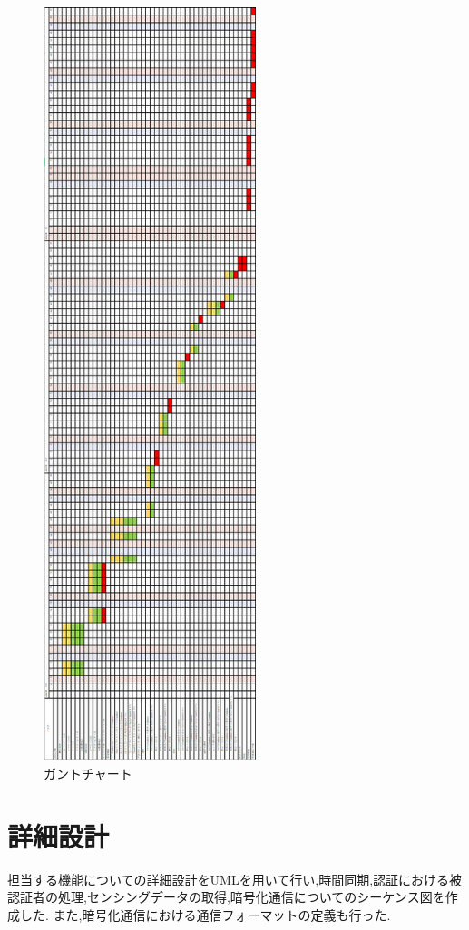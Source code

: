 \begin{figure}[H]
\begin{center}
	\includegraphics[height=220mm]{ganto.png}
	\caption{ガントチャート}
	\label{fig:ganto}
\end{center}
\end{figure}



\section{詳細設計}
担当する機能についての詳細設計をUMLを用いて行い,時間同期,認証における被認証者の処理,センシングデータの取得,暗号化通信についてのシーケンス図を作成した.
また,暗号化通信における通信フォーマットの定義も行った.

